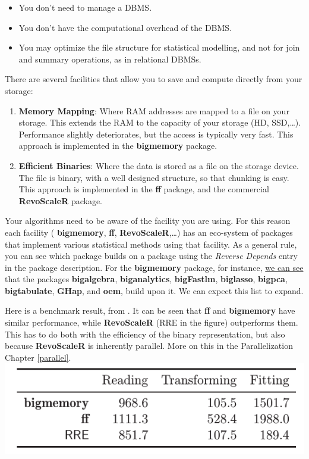 \documentclass[]{book}
\providecommand{\tightlist}{%
  \setlength{\itemsep}{0pt}\setlength{\parskip}{0pt}}
\theoremstyle{definition}
\theoremstyle{definition}
\theoremstyle{remark}
\begin{document}
\begin{itemize}
\tightlist
\item
  You don't need to manage a DBMS.
\item
  You don't have the computational overhead of the DBMS.
\item
  You may optimize the file structure for statistical modelling, and not
  for join and summary operations, as in relational DBMSs.
\end{itemize}

There are several facilities that allow you to save and compute directly
from your storage:

\begin{enumerate}
\def\labelenumi{\arabic{enumi}.}
\item
  \textbf{Memory Mapping}: Where RAM addresses are mapped to a file on
  your storage. This extends the RAM to the capacity of your storage
  (HD, SSD,\ldots{}). Performance slightly deteriorates, but the access
  is typically very fast. This approach is implemented in the
  \textbf{bigmemory} package.
\item
  \textbf{Efficient Binaries}: Where the data is stored as a file on the
  storage device. The file is binary, with a well designed structure, so
  that chunking is easy. This approach is implemented in the \textbf{ff}
  package, and the commercial \textbf{RevoScaleR} package.
\end{enumerate}

Your algorithms need to be aware of the facility you are using. For this
reason each facility ( \textbf{bigmemory}, \textbf{ff},
\textbf{RevoScaleR},\ldots{}) has an eco-system of packages that
implement various statistical methods using that facility. As a general
rule, you can see which package builds on a package using the
\emph{Reverse Depends} entry in the package description. For the
\textbf{bigmemory} package, for instance,
\href{https://cran.r-project.org/web/packages/bigmemory/index.html}{we
can see} that the packages \textbf{bigalgebra}, \textbf{biganalytics},
\textbf{bigFastlm}, \textbf{biglasso}, \textbf{bigpca},
\textbf{bigtabulate}, \textbf{GHap}, and \textbf{oem}, build upon it. We
can expect this list to expand.

Here is a benchmark result, from \citet{wang2015statistical}. It can be
seen that \textbf{ff} and \textbf{bigmemory} have similar performance,
while \textbf{RevoScaleR} (RRE in the figure) outperforms them. This has
to do both with the efficiency of the binary representation, but also
because \textbf{RevoScaleR} is inherently parallel. More on this in the
Parallelization Chapter \ref{parallel}.
\includegraphics{art/benchmark.png}
\end{document}
